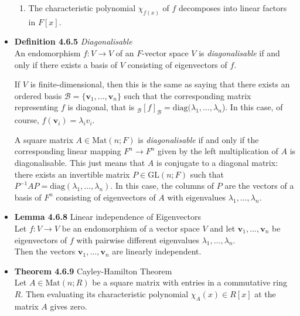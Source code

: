 \documentclass[11pt,a4paper]{article}
\begin{document}
\begin{itemize}
\begin{enumerate}
            \item The characteristic polynomial $\chi_{f(x)}$ of $f$ decomposes into linear
                factors in $F[x]$.

        \end{enumerate}

    \item \textbf{Definition 4.6.5} \emph{Diagonalisable} \\
        An endomorphism $f : V \to V$ of an $F$-vector space $V$ is \emph{diagonalisable}
        if and only if there exists a basis of $V$ consisting of eigenvectors of $f$.

        If $V$ is finite-dimensional, then this is the same as saying that there exists an
        ordered basis $\mathcal{B} = \{ \textbf{v}_1, \ldots, \textbf{v}_n \}$
        such that the corresponding matrix representing $f$ is diagonal,
        that is $_\mathcal{B}{[f]}_\mathcal{B} = \mathrm{diag}(\lambda_1, \ldots, \lambda_n$).
        In this case, of course, $f(\textbf{v}_i) = \lambda_i v_i$.

        A square matrix $A \in \mathrm{Mat}(n; F)$ is \emph{diagonalisable} if and only if
        the corresponding linear mapping $F^n \to F^n$ given by the left multiplication of $A$
        is diagonalisable.
        This just means that $A$ is conjugate to a diagonal matrix:
        there exists an invertible matrix $P \in \mathrm{GL}(n; F)$ such that
        $P^{-1} A P = \mathrm{diag}(\lambda_1, \ldots, \lambda_n)$.
        In this case, the columns of $P$ are the vectors of a basis of $F^n$ consisting of
        eigenvectors of $A$ with eigenvalues $\lambda_1, \ldots, \lambda_n$.

    \item \textbf{Lemma 4.6.8} Linear independence of Eigenvectors \\
        Let $f : V \to V$ be an endomorphism of a vector space $V$ and let
        $\textbf{v}_1, \ldots, \textbf{v}_n$ be eigenvectors of $f$ with pairwise different
        eigenvalues $\lambda_1, \ldots, \lambda_n$. \\
        Then the vectors $\textbf{v}_1, \ldots, \textbf{v}_n$ are linearly independent.

    \item \textbf{Theorem 4.6.9} Cayley-Hamilton Theorem \\
        Let $A \in \mathrm{Mat}(n; R)$ be a square matrix with entries in a commutative ring
        $R$.
        Then evaluating its characteristic polynomial $\chi_A(x) \in R[x]$ at the matrix $A$
        gives zero.

\end{itemize}
\end{document}
